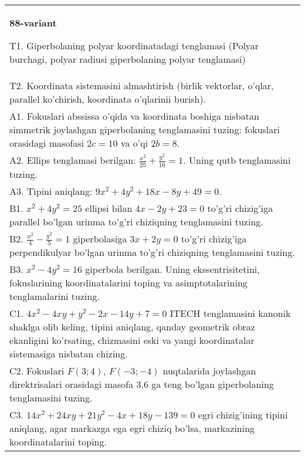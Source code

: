 \documentclass{article}
\begin{document}
\begin{tabular}{m{17cm}}
\textbf{88-variant}
\newline

T1. Giperbolaning polyar koordinatadagi tenglamasi (Polyar burchagi, polyar radiusi giperbolaning polyar tenglamasi)\\

T2. Koordinata sistemasini almashtirish (birlik vektorlar, o'qlar, parallel ko'chirish, koordinata o'qlarinii burish).\\

A1. Fokuslari abssissa o'qida va koordinata boshiga nisbatan simmetrik joylashgan giperbolaning tenglamasini tuzing: fokuslari orasidagi masofasi $2c=10$ va o'qi $2b=8$.\\

A2. Ellips tenglamasi berilgan: $\frac{x^2}{25}+\frac{y^2}{16}=1$. Uning qutb tenglamasini tuzing.\\

A3. Tipini aniqlang: $9x^{2}+4y^{2}+18x-8y+49=0$.\\

B1. $x^{2} + 4y^{2} = 25$ ellipsi bilan $4x - 2y + 23 = 0$ to'g'ri chizig'iga parallel bo'lgan urinma to'g'ri chiziqning tenglamasini tuzing.  \\

B2. $\frac{x^{2}}{4} - \frac{y^{2}}{5} = 1$ giperbolasiga $3x + 2y = 0$ to'g'ri chizig'iga perpendikulyar bo'lgan urinma to'g'ri chiziqning tenglamasini tuzing.\\

B3. $x^{2} - 4y^{2} = 16$ giperbola berilgan. Uning ekssentrisitetini, fokuslarining koordinatalarini toping va asimptotalarining tenglamalarini tuzing.\\

C1. $4x^{2} - 4xy + y^{2} - 2x - 14y + 7 = 0$ ITECH tenglamasini kanonik shaklga olib keling, tipini aniqlang, qanday geometrik obraz ekanligini ko'rsating, chizmasini eski va yangi koordinatalar sistemasiga nisbatan chizing.  \\

C2. Fokuslari $F(3;4)$, $F(-3;-4)$ nuqtalarida joylashgan direktrisalari orasidagi masofa 3,6 ga teng bo'lgan giperbolaning tenglamasini tuzing.  \\

C3. $14x^{2} + 24xy + 21y^{2} - 4x + 18y - 139 = 0$ egri chizig'ining tipini aniqlang, agar markazga ega egri chiziq bo'lsa, markazining koordinatalarini toping.  \\

\end{tabular}
\vspace{1cm}
\end{document}
